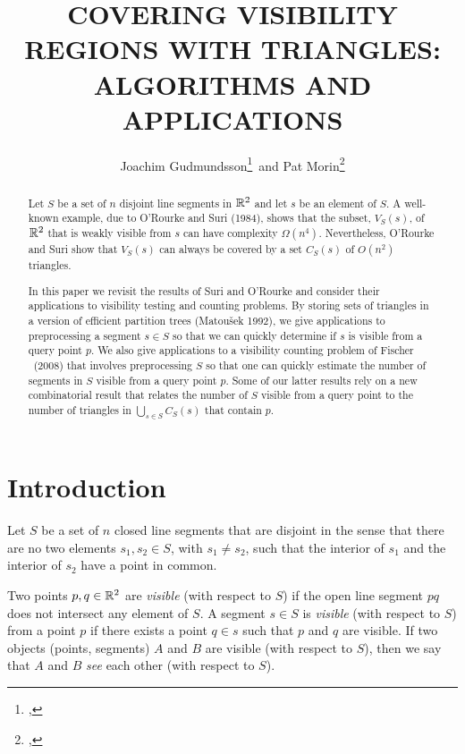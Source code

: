 \documentclass{patmorin}
\title{\MakeUppercase{Covering Visibility Regions with Triangles:\newline
       Algorithms and Applications}}
\author{Joachim Gudmundsson\thanks{\affil{NICTA},
\email{joachim.gudmundsson@nicta.com.au}}\, 
       and Pat Morin\thanks{\affil{Carleton University},
\email{morin@scs.carleton.ca}}}
\begin{document}
\maketitle
\begin{abstract}
Let $S$ be a set of $n$ disjoint line segments in $\mathbb{R}^2$ and let $s$
be an element of $S$.  A well-known example, due to O'Rourke and Suri
(1984), shows that the subset, $V_S(s)$, of $\mathbb{R}^2$ that is weakly visible
from $s$ can have complexity $\Omega(n^4)$.  Nevertheless, O'Rourke
and Suri show that $V_S(s)$ can always be covered by a set $C_S(s)$
of $O(n^2)$ triangles.

In this paper we revisit the results of Suri and O'Rourke and consider
their applications to visibility testing and counting problems.
By storing sets of triangles in a version of efficient partition trees
(Matou\v{s}ek 1992), we give applications to preprocessing a segment
$s\in S$ so that we can quickly determine if $s$ is visible from a query
point $p$.  We also give applications to a visibility counting problem of
Fischer \etal\ (2008) that involves preprocessing $S$ so that one
can quickly estimate the number of segments in $S$ visible from a query
point $p$.  Some of our latter results rely on a new combinatorial result
that relates the number of $S$ visible from a query point to the number
of triangles in $\bigcup_{s\in S} C_S(s)$ that contain $p$.
\end{abstract}

\section{Introduction}

Let $S$ be a set of $n$ closed line segments that are disjoint in the
sense that there are no two elements $s_1,s_2\in S$, with $s_1\neq s_2$,
such that the interior of $s_1$ and the interior of $s_2$ have a point
in common.

Two points $p,q\in\mathbb{R}^2$ are \emph{visible} (with respect to $S$) if the
open line segment $pq$ does not intersect any element of $S$.  A segment
$s\in S$ is \emph{visible} (with respect to $S$) from a point $p$ if there
exists a point $q\in s$ such that $p$ and $q$ are visible.  If two objects
(points, segments) $A$ and $B$ are visible (with respect to $S$), then we
say that $A$ and $B$ \emph{see} each other (with respect to $S$).
\end{document}
